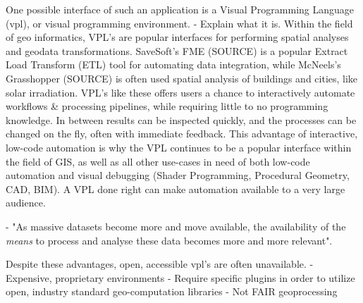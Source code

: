 One possible interface of such an application is a Visual Programming Language (vpl), or visual programming environment. 
- Explain what it is. 
Within the field of geo informatics, VPL's are popular interfaces for performing spatial analyses and geodata transformations. 
SaveSoft's FME (SOURCE) is a popular Extract Load Transform (ETL) tool for automating data integration, while McNeels's Grasshopper (SOURCE) is often used spatial analysis of buildings and cities, like solar irradiation. 
VPL's like these offers users a chance to interactively automate workflows \& processing pipelines, while requiring little to no programming knowledge. 
In between results can be inspected quickly, and the processes can be changed on the fly, often with immediate feedback.
This advantage of interactive, low-code automation is why the VPL continues to be a popular interface within the field of GIS, as well as all other use-cases in need of both low-code automation and visual debugging (Shader Programming, Procedural Geometry, CAD, BIM). 
A VPL done right can make automation available to a very large audience.

- "As massive datasets become more and move available, the availability of the \emph{means} to process and analyse these data becomes more and more relevant". 

Despite these advantages, open, accessible vpl's are often unavailable. 
- Expensive, proprietary environments 
- Require specific plugins in order to utilize open, industry standard geo-computation libraries
- Not FAIR geoprocessing




